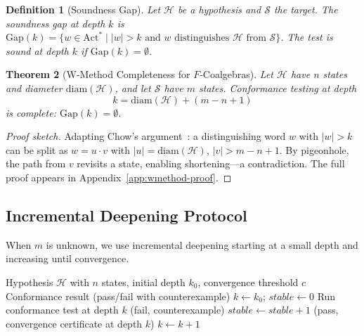 \documentclass[11pt]{article}
\newtheorem{theorem}{Theorem}
\newtheorem{definition}[theorem]{Definition}
\newcommand{\Act}{\ensuremath{\mathrm{Act}}}
\newcommand{\diam}{\ensuremath{\mathrm{diam}}}
\begin{document}
\begin{definition}[Soundness Gap]
\label{def:gap}
Let $\mathcal{H}$ be a hypothesis and $\mathcal{S}$ the target.
The \emph{soundness gap at depth $k$} is
$\mathrm{Gap}(k) = \{w \in \Act^* \mid |w| > k
  \text{ and $w$ distinguishes $\mathcal{H}$ from $\mathcal{S}$}\}$.
The test is \emph{sound} at depth $k$ if $\mathrm{Gap}(k) = \emptyset$.
\end{definition}

\begin{theorem}[W-Method Completeness for $F$-Coalgebras]
\label{thm:wmethod}
Let $\mathcal{H}$ have $n$ states and diameter $\diam(\mathcal{H})$, and
let $\mathcal{S}$ have $m$ states.
Conformance testing at depth
\begin{equation}\label{eq:wdepth}
  k = \diam(\mathcal{H}) + (m - n + 1)
\end{equation}
is complete: $\mathrm{Gap}(k) = \emptyset$.
\end{theorem}

\begin{proof}[Proof sketch]
Adapting Chow's argument~\cite{Chow78}: a distinguishing word $w$ with
$|w| > k$ can be split as $w = u \cdot v$ with
$|u| = \diam(\mathcal{H})$, $|v| > m - n + 1$.
By pigeonhole, the path from $v$ revisits a state, enabling shortening---a
contradiction.
The full proof appears in Appendix~\ref{app:wmethod-proof}.
\end{proof}

\subsection{Incremental Deepening Protocol}

When $m$ is unknown, we use incremental deepening starting at a small
depth and increasing until convergence.

\begin{algorithm}[t]
\caption{Incremental Deepening Conformance Testing}
\label{alg:deepen}
\begin{algorithmic}[1]
\Require Hypothesis $\mathcal{H}$ with $n$ states, initial depth $k_0$,
  convergence threshold $c$
\Ensure Conformance result (pass/fail with counterexample)
\State $k \gets k_0$;\; $\mathit{stable} \gets 0$
\Loop
  \State Run conformance test at depth $k$
    \State \Return (fail, counterexample)
  \EndIf
  \State $\mathit{stable} \gets \mathit{stable} + 1$
    \State \Return (pass, convergence certificate at depth $k$)
  \EndIf
  \State $k \gets k + 1$
\EndLoop
\end{algorithmic}
\end{algorithm}
\end{document}
